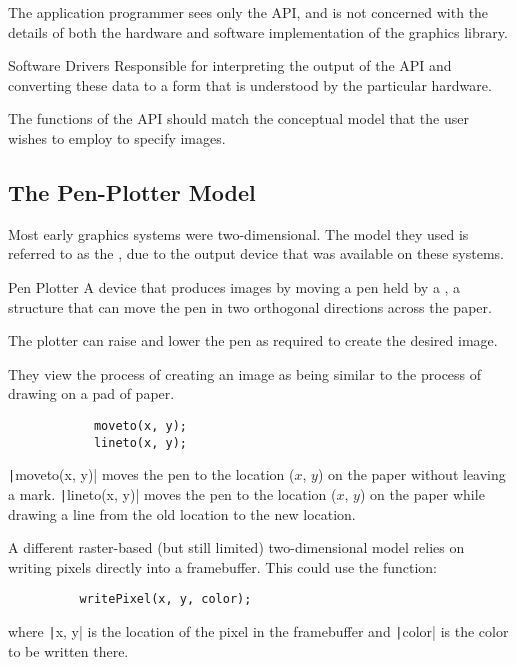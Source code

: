 \documentclass[../COS3712_Notes.tex]{subfiles}
\begin{document}
      The application programmer sees only the API,
      and is not concerned with the details of both the hardware and software implementation
      of the graphics library.

      \begin{definition}{Software Drivers}
        Responsible for interpreting the output of the API
        and converting these data to a form that is understood by the particular hardware.
      \end{definition}

      The functions of the API should match the conceptual model
      that the user wishes to employ to specify images.

      \subsection{The Pen-Plotter Model}
        Most early graphics systems were two-dimensional.
        The model they used is referred to as the \mbox{},
        due to the output device that was available on these systems.

        \begin{definition}{Pen Plotter}
          A device that produces images by moving a pen held by a ,
          a structure that can move the pen in two orthogonal directions across the paper.

          The plotter can raise and lower the pen as required to create the desired image.

          They view the process of creating an image as being similar to the process of
          drawing on a pad of paper.
        \end{definition}

        \begin{example}
          \begin{verbatim}
            moveto(x, y);
            lineto(x, y);
          \end{verbatim}
          \texttt|moveto(x, y)| moves the pen to the location ($x$, $y$)
          on the paper without leaving a mark.
          \texttt|lineto(x, y)| moves the pen to the location ($x$, $y$)
          on the paper while drawing a line from the old location to the new location.
        \end{example}

        A different raster-based (but still limited) two-dimensional model
        relies on writing pixels directly into a framebuffer.
        This could use the function:
        \begin{verbatim}
          writePixel(x, y, color);
        \end{verbatim}
        where \texttt|x, y| is the location of the pixel in the framebuffer
        and \texttt|color| is the color to be written there.
\end{document}
